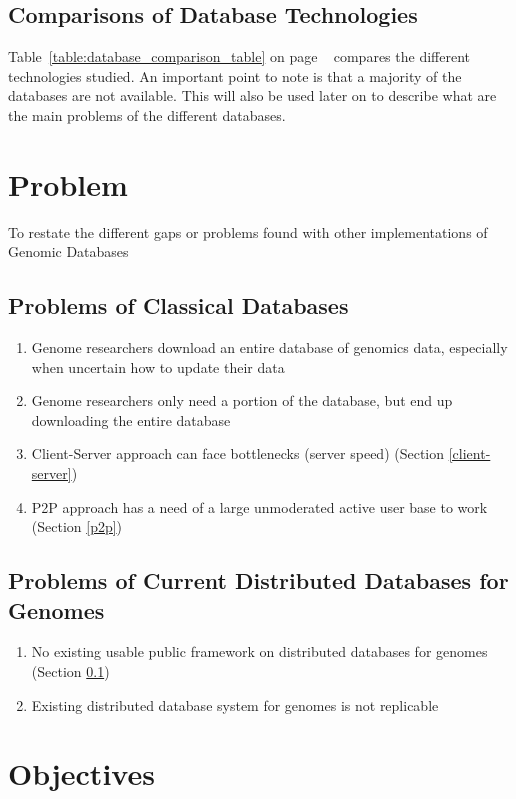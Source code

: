 \documentclass[acmsmall]{acmart}
\begin{document}
\subsection{Comparisons of Database Technologies} \label{compdb}

Table~\ref{table:database_comparison_table} on page ~\pageref{table:database_comparison_table} compares the different technologies studied. An important point to note is that a majority of the databases are not available. This will also be used later on to describe what are the main problems of the different databases.

\section{Problem}
To restate the different gaps or problems found with other implementations of Genomic Databases
\subsection{Problems of Classical Databases}
\begin{enumerate}
\item Genome researchers download an entire database of genomics data, especially when uncertain how to update their data
\item Genome researchers only need a portion of the database, but end up downloading the entire database
\item Client-Server approach can face bottlenecks (server speed) (Section \ref{client-server})
\item P2P approach has a need of a large unmoderated active user base to work (Section \ref{p2p})

\end{enumerate}

\subsection{Problems of Current Distributed Databases for Genomes}
\begin{enumerate}
    \item No existing usable public framework on distributed databases for genomes (Section \ref{compdb})
    \item Existing distributed database system for genomes is not replicable 
\end{enumerate}

\section{Objectives}
\end{document}
